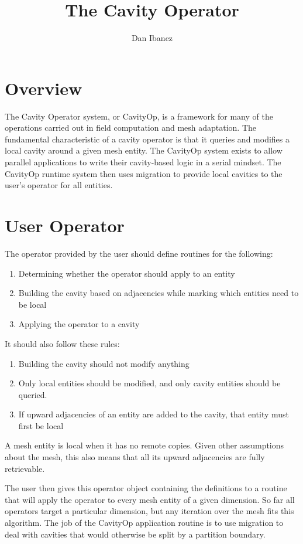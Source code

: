 \documentclass{article}
\title{The Cavity Operator}
\author{Dan Ibanez}
\begin{document}
\maketitle

\section{Overview}

The Cavity Operator system, or CavityOp, is a framework
for many of the operations carried out in field computation
and mesh adaptation.
The fundamental characteristic of a cavity operator is that
it queries and modifies a local cavity around a given mesh
entity.
The CavityOp system exists to allow parallel applications to
write their cavity-based logic in a serial mindset.
The CavityOp runtime system then uses migration to provide
local cavities to the user's operator for all entities.

\section{User Operator}

The operator provided by the user should define routines for
the following:
\begin{enumerate}
\item Determining whether the operator should apply to an entity
\item Building the cavity based on adjacencies while
marking which entities need to be local
\item Applying the operator to a cavity
\end{enumerate}
It should also follow these rules:
\begin{enumerate}
\item Building the cavity should not modify anything
\item Only local entities should be modified, and only cavity
entities should be queried.
\item If upward adjacencies of an entity are added to the cavity,
that entity must first be local
\end{enumerate}
A mesh entity is local when it has no remote copies.
Given other assumptions about the mesh, this also means
that all its upward adjacencies are fully retrievable.

The user then gives this operator object containing the definitions
to a routine that will apply the operator to every mesh
entity of a given dimension.
So far all operators target a particular dimension, but any
iteration over the mesh fits this algorithm.
The job of the CavityOp application routine is to use migration
to deal with cavities that would otherwise be split by a
partition boundary.
\end{document}
